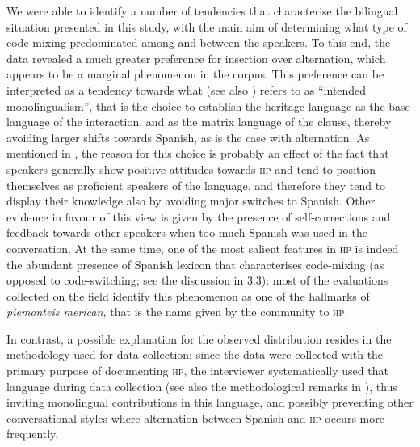 \documentclass[output=paper]{langscibook}
\begin{document}
We were able to identify a number of tendencies that characterise the bilingual situation presented in this study, with the main aim of determining what type of code-mixing predominated among and between the speakers. To this end, the data revealed a much greater preference for insertion over alternation, which appears to be a marginal phenomenon in the corpus. This preference can be interpreted as a tendency towards what \citet{DalNegro2013} (see also \citealt{Clyne2003}) refers to as “intended monolingualism”, that is the choice to establish the heritage language as the base language of the interaction, and as the matrix language of the clause, thereby avoiding larger shifts towards Spanish, as is the case with alternation. As mentioned in , the reason for this choice is probably an effect of the fact that speakers generally show positive attitudes towards \textsc{hp} and tend to position themselves as proficient speakers of the language, and therefore they tend to display their knowledge also by avoiding major switches to Spanish. Other evidence in favour of this view is given by the presence of self-corrections and feedback towards other speakers when too much Spanish was used in the conversation. At the same time, one of the most salient features in \textsc{hp} is indeed the abundant presence of Spanish lexicon that characterises code-mixing (as opposed to code-switching; see the discussion in 3.3): most of the evaluations collected on the field identify this phenomenon as one of the hallmarks of \textit{piemonteis merican,} that is the name given by the community to \textsc{hp}.

In contrast, a possible explanation for the observed distribution resides in the methodology used for data collection: since the data were collected with the primary purpose of documenting \textsc{hp}, the interviewer systematically used that language during data collection (see also the methodological remarks in \citealt{BlommaertDong2010}), thus inviting monolingual contributions in this language, and possibly preventing other conversational styles where alternation between Spanish and \textsc{hp} occurs more frequently. 
\end{document}
